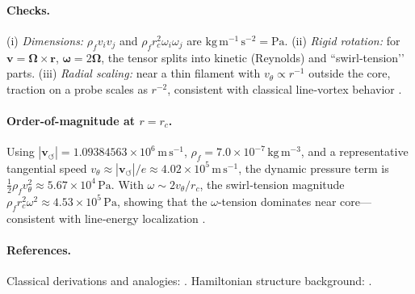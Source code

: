 \documentclass[10pt,reprint,aps,onecolumn,nofootinbib]{revtex4-2}
\begin{document}
    \paragraph{Checks.}
    (i) \emph{Dimensions:} \(\rho_{\!f}v_i v_j\) and
        \(\rho_{\!f} r_c^{2}\omega_i\omega_j\) are \(\mathrm{kg\,m^{-1}\,s^{-2}}=\mathrm{Pa}\).
        (ii) \emph{Rigid rotation:} for \(\mathbf{v}=\boldsymbol{\Omega}\times\mathbf{r}\),
        \(\boldsymbol{\omega}=2\boldsymbol{\Omega}\), the tensor splits into kinetic (Reynolds) and “swirl‐tension’’ parts.
        (iii) \emph{Radial scaling:} near a thin filament with \(v_\theta\propto r^{-1}\) outside the core, traction on a probe scales as \(r^{-2}\), consistent with classical line‐vortex behavior \cite{Saffman1992}.

    \paragraph{Order-of-magnitude at \(r\!=\!r_c\).}
        Using
        \(|\mathbf{v}_{\!\boldsymbol{\circlearrowleft}}|=1.09384563\times10^{6}\,\mathrm{m\,s^{-1}}\),
        \(\rho_{\!f}=7.0\times10^{-7}\,\mathrm{kg\,m^{-3}}\),
        and a representative tangential speed \(v_\theta \approx |\mathbf{v}_{\!\boldsymbol{\circlearrowleft}}|/e \approx 4.02\times10^{5}\,\mathrm{m\,s^{-1}}\),
        the dynamic pressure term is
        \(\tfrac12 \rho_{\!f}v_\theta^{2}\approx 5.67\times10^{4}\,\mathrm{Pa}\).
        With \(\omega\sim 2v_\theta/r_c\),
        the swirl‐tension magnitude \(\rho_{\!f} r_c^{2}\omega^{2}\approx 4.53\times10^{5}\,\mathrm{Pa}\),
        showing that the \(\omega\)-tension dominates near core—consistent with line‐energy localization
        \cite{Saffman1992,Batchelor1967,LandauFM}.

    \paragraph{References.}
        Classical derivations and analogies: \cite{Saffman1992,Batchelor1967,LandauFM}.
        Hamiltonian structure background: \cite{Salmon1988,Morrison1998}.
\end{document}
